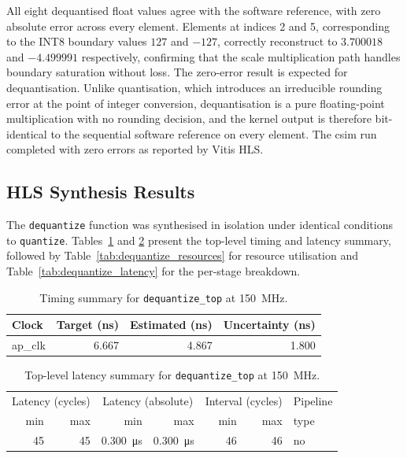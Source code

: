 All eight dequantised float values agree with the software
reference, with zero absolute error across every element. Elements at
indices 2 and 5, corresponding to the INT8 boundary values $127$ and
$-127$, correctly reconstruct to $3.700018$ and $-4.499991$
respectively, confirming that the scale multiplication path handles
boundary saturation without loss. The zero-error result is expected for
dequantisation. Unlike quantisation, which introduces an irreducible
rounding error at the point of integer conversion, dequantisation is a
pure floating-point multiplication with no rounding decision, and the
kernel output is therefore bit-identical to the sequential software
reference on every element. The csim run completed with zero errors as
reported by Vitis HLS.

\subsection{HLS Synthesis Results}
\label{subsec:dequantize_csyn}

The \texttt{dequantize} function was synthesised in isolation under
identical conditions to \texttt{quantize}.
Tables~\ref{tab:dequantize_timing} and \ref{tab:dequantize_top_latency}
present the top-level timing and latency summary, followed by
Table~\ref{tab:dequantize_resources} for resource utilisation and
Table~\ref{tab:dequantize_latency} for the per-stage breakdown.

\begin{table}[H]
  \centering
  \begin{tabular}{lrrr}
    \toprule
    Clock & Target (ns) & Estimated (ns) & Uncertainty (ns) \\
    \midrule
    ap\_clk & 6.667 & 4.867 & 1.800 \\
    \bottomrule
  \end{tabular}
  \caption{Timing summary for \texttt{dequantize\_top} at
           \SI{150}{\mega\hertz}.}
  \label{tab:dequantize_timing}

\end{table}

\begin{table}[H]
  \centering
  \begin{tabular}{rrrrrrl}
    \toprule
    \multicolumn{2}{c}{Latency (cycles)} &
    \multicolumn{2}{c}{Latency (absolute)} &
    \multicolumn{2}{c}{Interval (cycles)} & Pipeline \\
    min & max & min & max & min & max & type \\
    \midrule
    45 & 45 & \SI{0.300}{\micro\second} & \SI{0.300}{\micro\second} & 46 & 46 & no \\
    \bottomrule
  \end{tabular}
  \caption{Top-level latency summary for \texttt{dequantize\_top} at
           \SI{150}{\mega\hertz}.}
  \label{tab:dequantize_top_latency}

\end{table}

